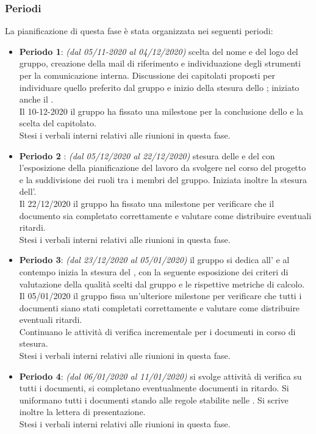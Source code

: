 \subsubsection{Periodi}
La pianificazione di questa fase è stata organizzata nei seguenti periodi:
\begin{itemize}
\item \textbf{Periodo 1}: \textit{(dal 05/11-2020 al 04/12/2020)} scelta del nome e del logo del gruppo, creazione della mail di riferimento e individuazione degli strumenti per la comunicazione interna. Discussione dei capitolati proposti per individuare quello preferito dal gruppo e inizio della stesura dello \textit{\SdF{}}; iniziato anche il \Glossario. \\Il 10-12-2020 il gruppo ha fissato una milestone\glo{} per la conclusione dello \textit{\SdF{}} e la scelta del capitolato.\\Stesi i verbali interni relativi alle riunioni in questa fase.
\item \textbf{Periodo 2 }: \textit{(dal 05/12/2020 al 22/12/2020)} stesura delle \textit{\NdP{}} e del \textit{\PdP{}} con l'esposizione della pianificazione del lavoro da svolgere nel corso del progetto e la suddivisione dei ruoli tra i membri del gruppo. Iniziata inoltre la stesura dell'\textit{\AdR{}}.\\Il 22/12/2020 il gruppo ha fissato una milestone per verificare che il documento \textit{\NdP{}} sia completato correttamente e valutare come distribuire eventuali ritardi.\\Stesi i verbali interni relativi alle riunioni in questa fase.
\item \textbf{Periodo 3}: \textit{(dal 23/12/2020 al 05/01/2020)} il gruppo si dedica all'\textit{\AdR{}} e al contempo inizia la stesura del \textit{\PdQ{}}, con la seguente esposizione dei criteri di valutazione della qualità scelti dal gruppo e le rispettive metriche\glo{} di calcolo.\\Il 05/01/2020 il gruppo fissa un'ulteriore milestone per verificare che tutti i documenti siano stati completati correttamente e valutare come distribuire eventuali ritardi.\\Continuano le attività di verifica incrementale per i documenti in corso di stesura.\\Stesi i verbali interni relativi alle riunioni in questa fase.
\item \textbf{Periodo 4}: \textit{(dal 06/01/2020 al 11/01/2020)} si svolge attività di verifica su tutti i documenti, si completano eventualmente documenti in ritardo. Si uniformano tutti i documenti stando alle regole stabilite nelle \textit{\NdP{}}. Si scrive inoltre la lettera di presentazione.\\Stesi i verbali interni relativi alle riunioni in questa fase.
\end{itemize}

